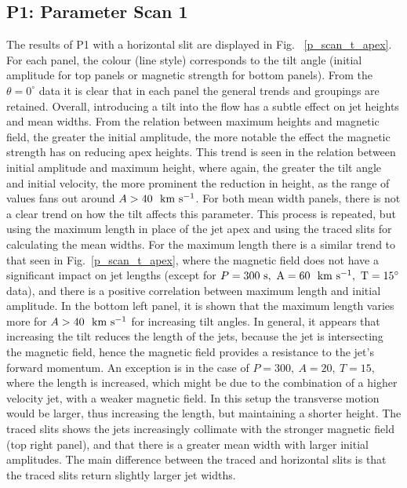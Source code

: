 \subsection{P1: Parameter Scan 1}
\label{subsec:pscansII_I}
The results of P1 with a horizontal slit are displayed in Fig. ~\ref{p_scan_t_apex}. For each panel, the colour (line style) corresponds to the tilt angle (initial amplitude for top panels or magnetic strength for bottom panels). From the $\theta=0^{\circ}$ data it is clear that in each panel the general trends and groupings are retained. Overall, introducing a tilt into the flow has a subtle effect on jet heights and mean widths. From the relation between maximum heights and magnetic field, the greater the initial amplitude, the more notable the effect the magnetic strength has on reducing apex heights. This trend is seen in the relation between initial amplitude and maximum height, where again, the greater the tilt angle and initial velocity, the more prominent the reduction in height, as the range of values fans out around $A>40~~\rm{km ~s^{-1}}$. For both mean width panels, there is not a clear trend on how the tilt affects this parameter. \np
%
This process is repeated, but using the maximum length in place of the jet apex and using the traced slits for calculating the mean widths. For the maximum length there is a similar trend to that seen in Fig.~\ref{p_scan_t_apex}, where the magnetic field does not have a significant impact on jet lengths (except for $P=300~\rm{s},~A=60~~\rm{km ~s^{-1}},~T=15^{\circ}$ data), and there is a positive correlation between maximum length and initial amplitude. In the bottom left panel, it is shown that the maximum length varies more for $A>40~~\rm{km ~s^{-1}}$ for increasing tilt angles. In general, it appears that increasing the tilt reduces the length of the jets, because the jet is intersecting the magnetic field, hence the magnetic field provides a resistance to the jet's forward momentum. An exception is in the case of $P=300,~A=20,~T=15$, where the length is increased, which might be due to the combination of a higher velocity jet, with a weaker magnetic field. In this setup the transverse motion would be larger, thus increasing the length, but maintaining a shorter height. The traced slits shows the jets increasingly collimate with the stronger magnetic field (top right panel), and that there is a greater mean width with larger initial amplitudes. The main difference between the traced and horizontal slits is that the traced slits return slightly larger jet widths.
%
